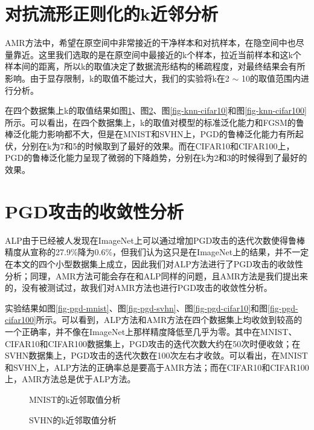 \clearpage

\section{对抗流形正则化的k近邻分析}

AMR方法中，希望在原空间中非常接近的干净样本和对抗样本，在隐空间中也尽量靠近。这里我们选取的是在原空间中最接近的k个样本，拉近当前样本和这k个样本间的距离，所以k的取值决定了数据流形结构的稀疏程度，对最终结果会有所影响。由于显存限制，k的取值不能过大，我们的实验将k在2 $\sim$ 10的取值范围内进行分析。

在四个数据集上k的取值结果如图\ref{fig-knn-mnist}、图\ref{fig-knn-svhn}、图\ref{fig-knn-cifar10}和图\ref{fig-knn-cifar100}所示。可以看出，在四个数据集上，k的取值对模型的标准泛化能力和FGSM的鲁棒泛化能力影响都不大，但是在MNIST和SVHN上，PGD的鲁棒泛化能力有所起伏，分别在k为7和5的时候取到了最好的效果。而在CIFAR10和CIFAR100上，PGD的鲁棒泛化能力呈现了微弱的下降趋势，分别在k为2和3的时候得到了最好的效果。


\section{PGD攻击的收敛性分析} \label{section:convergence}

ALP由于已经被人发现在ImageNet上可以通过增加PGD攻击的迭代次数使得鲁棒精度从宣称的27.9\%降为0.6\%\cite{engstrom2018evaluating}，但我们认为这只是在ImageNet上的结果，并不一定在本文的四个小型数据集上成立，因此我们对ALP方法进行了PGD攻击的收敛性分析；同理，AMR方法可能会存在和ALP同样的问题，且AMR方法是我们提出来的，没有被测试过，故我们对AMR方法也进行PGD攻击的收敛性分析。

实验结果如图\ref{fig-pgd-mnist}、图\ref{fig-pgd-svhn}、图\ref{fig-pgd-cifar10}和图\ref{fig-pgd-cifar100}所示。可以看到，ALP方法和AMR方法在四个数据集上均收敛到较高的一个正确率，并不像在ImageNet上那样精度降低至几乎为零。其中在MNIST、CIFAR10和CIFAR100数据集上，PGD攻击的迭代次数大约在50次时便收敛；在SVHN数据集上，PGD攻击的迭代次数在100次左右才收敛。可以看出，在MNIST和SVHN上，ALP方法的正确率总是要高于AMR方法；而在CIFAR10和CIFAR100上，AMR方法总是优于ALP方法。

\clearpage

\begin{figure}[t]
    \centering
    
    \caption{MNIST的k近邻取值分析}
    \label{fig-knn-mnist}
\end{figure}

\begin{figure}[b]
    \centering
    
    \caption{SVHN的k近邻取值分析}
    \label{fig-knn-svhn}
\end{figure}

